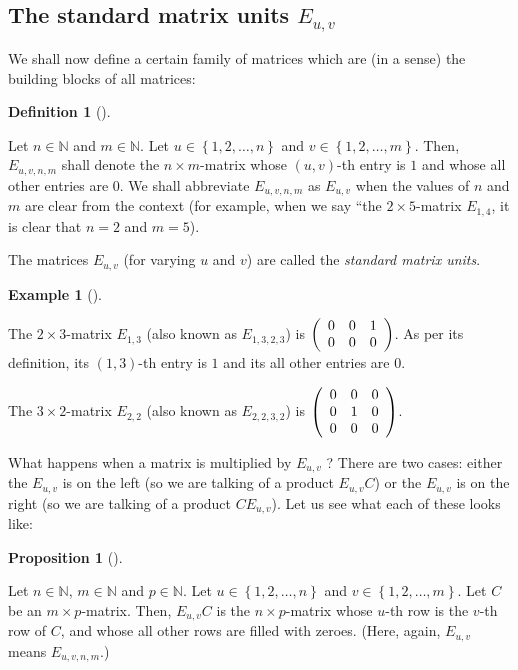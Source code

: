 \documentclass[numbers=enddot,12pt,final,onecolumn,notitlepage]{scrartcl}%
\theoremstyle{definition}
\newtheorem{prop}[theo]{Proposition}
\newenvironment{proposition}[1][]
{\begin{prop}[#1]\begin{leftbar}}
{\end{leftbar}\end{prop}}
\newtheorem{defi}[theo]{Definition}
\newenvironment{definition}[1][]
{\begin{defi}[#1]\begin{leftbar}}
{\end{leftbar}\end{defi}}
\newtheorem{exam}[theo]{Example}
\newenvironment{example}[1][]
{\begin{exam}[#1]\begin{leftbar}}
{\end{leftbar}\end{exam}}
\begin{document}
\subsection{The standard matrix units $E_{u,v}$}

We shall now define a certain family of matrices which are (in a sense) the
building blocks of all matrices:

\begin{definition}
\label{def.Euv}Let $n\in\mathbb{N}$ and $m\in\mathbb{N}$. Let $u\in\left\{
1,2,\ldots,n\right\}  $ and $v\in\left\{  1,2,\ldots,m\right\}  $. Then,
$E_{u,v,n,m}$ shall denote the $n\times m$-matrix whose $\left(  u,v\right)
$-th entry is $1$ and whose all other entries are $0$. We shall abbreviate
$E_{u,v,n,m}$ as $E_{u,v}$ when the values of $n$ and $m$ are clear from the
context (for example, when we say \textquotedblleft the $2\times5$-matrix
$E_{1,4}$, it is clear that $n=2$ and $m=5$).

The matrices $E_{u,v}$ (for varying $u$ and $v$) are called the
\textit{standard matrix units}.
\end{definition}

\begin{example}
The $2\times3$-matrix $E_{1,3}$ (also known as $E_{1,3,2,3}$) is $\left(
\begin{array}
[c]{ccc}%
0 & 0 & 1\\
0 & 0 & 0
\end{array}
\right)  $. As per its definition, its $\left(  1,3\right)  $-th entry is $1$
and its all other entries are $0$.

The $3\times2$-matrix $E_{2,2}$ (also known as $E_{2,2,3,2}$) is $\left(
\begin{array}
[c]{ccc}%
0 & 0 & 0\\
0 & 1 & 0\\
0 & 0 & 0
\end{array}
\right)  $.
\end{example}

What happens when a matrix is multiplied by $E_{u,v}$ ? There are two cases:
either the $E_{u,v}$ is on the left (so we are talking of a product $E_{u,v}%
C$) or the $E_{u,v}$ is on the right (so we are talking of a product
$CE_{u,v}$). Let us see what each of these looks like:

\begin{proposition}
\label{prop.Euv.laction}Let $n\in\mathbb{N}$, $m\in\mathbb{N}$ and
$p\in\mathbb{N}$. Let $u\in\left\{  1,2,\ldots,n\right\}  $ and $v\in\left\{
1,2,\ldots,m\right\}  $. Let $C$ be an $m\times p$-matrix. Then, $E_{u,v}C$ is
the $n\times p$-matrix whose $u$-th row is the $v$-th row of $C$, and whose
all other rows are filled with zeroes. (Here, again, $E_{u,v}$ means
$E_{u,v,n,m}$.)
\end{proposition}
\end{document}
